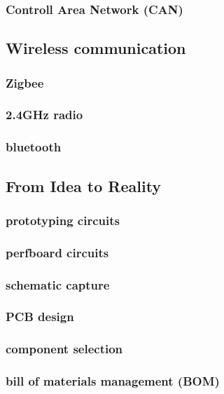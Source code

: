 \documentclass[]{journal}
\begin{document}
		\subsubsection{Controll Area Network (CAN)}
	\subsection{Wireless communication}
		\subsubsection{Zigbee}
		\subsubsection{2.4GHz radio}
		\subsubsection{bluetooth}
	\subsection{From Idea to Reality}
		\subsubsection{prototyping circuits}
		\subsubsection{perfboard  circuits}
		\subsubsection{schematic capture}
		\subsubsection{PCB design}
		\subsubsection{component selection}
		\subsubsection{bill of materials management (BOM)}
\end{document}
